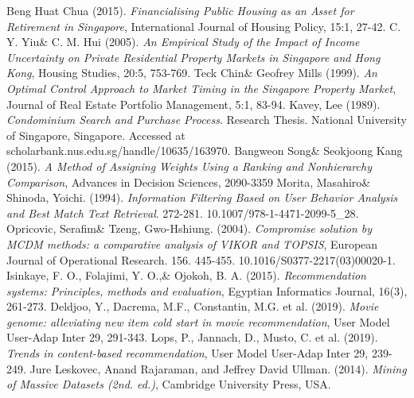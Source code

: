 \documentclass[a4paper, 11pt]{article}
\begin{document}
	\begin{thebibliography}{00} \footnotesize
		Beng Huat Chua (2015). \textit{Financialising Public Housing as an Asset for Retirement in Singapore}, International Journal of Housing Policy, 15:1, 27-42.
		 C. Y. Yiu\& C. M. Hui (2005). \textit{An Empirical Study of the Impact of Income Uncertainty on Private Residential Property Markets in Singapore and Hong Kong}, Housing Studies, 20:5, 753-769.
		 Teck Chin\& Geofrey Mills (1999). \textit{An Optimal Control Approach to Market Timing in the Singapore Property Market}, Journal of Real Estate Portfolio Management, 5:1, 83-94.
		 Kavey, Lee (1989). \textit{Condominium Search and Purchase Process}. Research Thesis. National University of Singapore, Singapore. Accessed at scholarbank.nus.edu.sg/handle/10635/163970.
		 Bangweon Song\& Seokjoong Kang (2015). \textit{A Method of Assigning Weights Using a Ranking and Nonhierarchy Comparison}, Advances in Decision Sciences, 2090-3359
		 Morita, Masahiro\& Shinoda, Yoichi. (1994). \textit{Information Filtering Based on User Behavior Analysis and Best Match Text Retrieval}. 272-281. 10.1007/978-1-4471-2099-5\_28.
		 Opricovic, Serafim\& Tzeng, Gwo-Hshiung. (2004). \textit{Compromise solution by MCDM methods: a comparative analysis of VIKOR and TOPSIS}, European Journal of Operational Research. 156. 445-455. 10.1016/S0377-2217(03)00020-1. 
		 Isinkaye, F. O., Folajimi, Y. O.,\& Ojokoh, B. A. (2015). \textit{Recommendation systems: Principles, methods and evaluation}, Egyptian Informatics Journal, 16(3), 261-273.
		 Deldjoo, Y., Dacrema, M.F., Constantin, M.G. et al. (2019). \textit{Movie genome: alleviating new item cold start in movie recommendation}, User Model User-Adap Inter 29, 291-343.
		 Lops, P., Jannach, D., Musto, C. et al. (2019). \textit{Trends in content-based recommendation}, User Model User-Adap Inter 29, 239-249.
		 Jure Leskovec, Anand Rajaraman, and Jeffrey David Ullman. (2014). \textit{Mining of Massive Datasets (2nd. ed.)}, Cambridge University Press, USA.

	\end{thebibliography}
\end{document}
